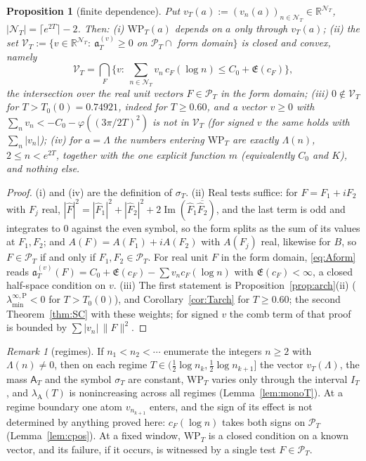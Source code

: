 \documentclass[11pt]{amsart}
\newtheorem{proposition}[theorem]{Proposition}
\theoremstyle{definition}
\theoremstyle{remark}
\newtheorem{remark}[theorem]{Remark}
\newcommand{\R}{\mathbb R}
\newcommand{\Iml}{\operatorname{Im}}
\newcommand{\PT}{\mathcal P_T}
\newcommand{\IT}{I_T}
\newcommand{\lamA}{\lambda_{\mathrm A}(T)}
\newcommand{\sT}{\sigma_T}
\newcommand{\Fh}{\widehat F}
\newcommand{\cF}{c_F}
\newcommand{\Lev}{\mathfrak E}
\newcommand{\NT}{\mathcal N_T}
\newcommand{\Aconst}{\mathsf A_T}
\newcommand{\laminfP}{\lambda^{\infty,\mathrm P}_{\min}}
\begin{document}
\begin{proposition}[finite dependence]\label{prop:finite}
Put $v_T(a):=(v_n(a))_{n\in\NT}\in\R^{\NT}$, $|\NT|=\lceil e^{2T}\rceil-2$. Then:
\emph{(i)} $\mathrm{WP}_T(a)$ depends on $a$ only through $v_T(a)$;
\emph{(ii)} the set $\mathcal V_T:=\{v\in\R^{\NT}:\ \mathfrak a^{(v)}_T\ge0$ on $\PT\cap$ form domain$\}$ is closed
and convex, namely
\[
\mathcal V_T=\bigcap_{F}\Big\{v:\ \sum_{n\in\NT}v_n\,\cF(\log n)\le C_0+\Lev(\cF)\Big\},
\]
the intersection over the real unit vectors $F\in\PT$ in the form domain;
\emph{(iii)} $0\notin\mathcal V_T$ for $T>T_0(0)=0.74921$, indeed for $T\ge0.60$, and a vector $v\ge0$ with
$\sum_nv_n<-C_0-\varphi((3\pi/2T)^2)$ is not in $\mathcal V_T$ (for signed $v$ the same holds with
$\sum_n|v_n|$);
\emph{(iv)} for $a=\Lambda$ the numbers entering $\mathrm{WP}_T$ are exactly $\Lambda(n)$, $2\le n<e^{2T}$,
together with the one explicit function $m$ (equivalently $C_0$ and $K$), and nothing else.
\end{proposition}
\begin{proof}
(i) and (iv) are the definition of $\sT$. (ii) Real tests suffice: for $F=F_1+iF_2$ with $F_j$ real,
$|\Fh|^2=|\Fh_1|^2+|\Fh_2|^2+2\Iml(\Fh_1\overline{\Fh_2})$, and the last term is odd and integrates to $0$
against the even symbol, so the form splits as the sum of its values at $F_1,F_2$; and $A(F)=A(F_1)+iA(F_2)$
with $A(F_j)$ real, likewise for $B$, so $F\in\PT$ if and only if $F_1,F_2\in\PT$. For real unit $F$ in the
form domain, \eqref{eq:Aform} reads $\mathfrak a^{(v)}_T(F)=C_0+\Lev(\cF)-\sum v_n\cF(\log n)$ with
$\Lev(\cF)<\infty$, a closed half-space condition on $v$. (iii) The first statement is
Proposition~\ref{prop:arch}(ii) ($\laminfP<0$ for $T>T_0(0)$), and Corollary~\ref{cor:Tarch} for $T\ge0.60$; the second Theorem~\ref{thm:SC} with these
weights; for signed $v$ the comb term of that proof is bounded by $\sum|v_n|\,\|F\|^2$.
\end{proof}

\begin{remark}[regimes]\label{rem:regimes}
If $n_1<n_2<\cdots$ enumerate the integers $n\ge2$ with $\Lambda(n)\ne0$, then on each regime
$T\in(\frac12\log n_k,\frac12\log n_{k+1}]$ the vector $v_T(\Lambda)$, the mass $\Aconst$ and the symbol $\sT$
are constant, $\mathrm{WP}_T$ varies only through the interval $\IT$, and $\lamA$ is nonincreasing across all
regimes (Lemma~\ref{lem:monoT}). At a regime boundary one atom $v_{n_{k+1}}$ enters, and the sign of its
effect is not determined by anything proved here: $\cF(\log n)$ takes both signs on $\PT$
(Lemma~\ref{lem:cpos}). At a fixed window, $\mathrm{WP}_T$ is a closed condition on a known vector, and its
failure, if it occurs, is witnessed by a single test $F\in\PT$.
\end{remark}
\end{document}
